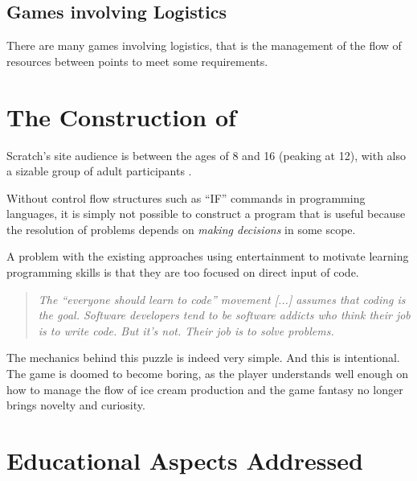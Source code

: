 \documentclass{sigchi}
\begin{document}
    \subsection{Games involving Logistics}
        There are many games involving logistics, that is the management of the
        flow of resources between points to meet some requirements.

\section{The Construction of \gamename}
    Scratch's site audience is between the ages of 8 and 16 (peaking at 12),
    with also a sizable group of adult participants \cite{Resnick2009}.

    Without control flow structures such as ``IF'' commands in programming
    languages, it is simply not possible to construct a program that is useful
    because the resolution of problems depends on \textit{making decisions} in
    some scope.

    A problem with the existing approaches using entertainment to motivate
    learning programming skills is that they are too focused on direct input of
    code.
    \begin{quotation}
        \noindent
        \textit{The ``everyone should learn to code'' movement [...] assumes
                that coding is the goal. Software developers tend to be software
                addicts who think their job is to write code. But it's not.
                Their job is to solve problems.} \cite{Atwood2012}
    \end{quotation}

    The mechanics behind this puzzle is indeed very simple. And this is
    intentional. The game is doomed to become boring, as the player understands
    well enough on how to manage the flow of ice cream production and the game
    fantasy no longer brings novelty and curiosity.

\section{Educational Aspects Addressed}
\end{document}
